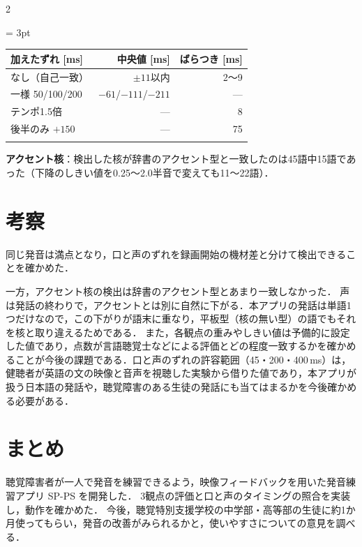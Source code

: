 \begin{multicols*}{2}
\begin{table} %
	\centering
	\tabcolsep = 3pt
	\begin{tabular}{lrr}
		\Hline
		加えたずれ [ms] & 中央値 [ms] & ばらつき [ms]\\
		\hline
		なし（自己一致） & $\pm 11$以内 & 2〜9\\
		一様 50/100/200 & $-61$/$-111$/$-211$ & ---\\
		テンポ1.5倍 & --- & 8\\
		後半のみ $+150$ & --- & 75\\
		\Hline
	\end{tabular}
\end{table}

\textbf{アクセント核}：検出した核が辞書のアクセント型と一致したのは45語中15語であった（下降のしきい値を0.25〜2.0半音で変えても11〜22語）．



\section{考察}
同じ発音は満点となり，口と声のずれを録画開始の機材差と分けて検出できることを確かめた．

一方，アクセント核の検出は辞書のアクセント型とあまり一致しなかった．
声は発話の終わりで，アクセントとは別に自然に下がる．本アプリの発話は単語1つだけなので，この下がりが語末に重なり，平板型（核の無い型）の語でもそれを核と取り違えるためである．
また，各観点の重みやしきい値は予備的に設定した値であり，点数が言語聴覚士などによる評価とどの程度一致するかを確かめることが今後の課題である．口と声のずれの許容範囲（45・200・400\,ms）は，健聴者が英語の文の映像と音声を視聴した実験\cite{grant2003,grant2001}から借りた値であり，本アプリが扱う日本語の発話や，聴覚障害のある生徒の発話にも当てはまるかを今後確かめる必要がある．

\section{まとめ}
聴覚障害者が一人で発音を練習できるよう，映像フィードバックを用いた発音練習アプリ SP-PS を開発した．
3観点の評価と口と声のタイミングの照合を実装し，動作を確かめた．
今後，聴覚特別支援学校の中学部・高等部の生徒に約1か月使ってもらい，発音の改善がみられるかと，使いやすさについての意見を調べる．


\end{multicols*}
